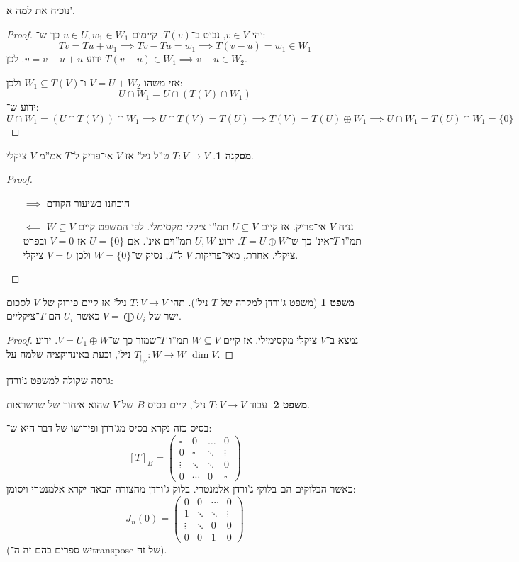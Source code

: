 \documentclass[a4paper]{article}
\newcommand\co        {\colon}
\newcommand\pms[1]    {\begin{pmatrix}
		#1
\end{pmatrix}}
\theoremstyle{definition}
\newtheorem{Theorem}{משפט}
\newtheorem{Collary}{מסקנה}
\newcommand\cola [1] {\begin{Collary}#1\end{Collary}}
\newcommand\theo  [1] {\begin{Theorem}#1\end{Theorem}}
\begin{document}
	נוכיח את למה א'. \begin{proof}
		יהי $v \in V$, נביט ב־$T(v)$. קיימים $u \in U, w_1 \in W_1$ כך ש־: 
		\[ Tv = Tu + w_1 \implies Tv - Tu = w_1 \implies T(v - u) = w_1 \in W_1 \]
		ידוע $v = v - u + u$. לכן $T(v - u) \in W_1 \implies v - u \in W_2$. 
		
		אזי משהו $V = U + W_2$ ו־$W_1 \subseteq T(V)$ ולכן: 
		\[ U \cap W_1 = U \cap (T(V) \cap W_1) \]
		ידוע ש־: 
		\[ U \cap W_1 = (U \cap T(V)) \cap W_1 \implies U \cap T(V) = T(U) \implies T(V) = T(U) \oplus W_1 \implies U \cap W_1 = T(U) \cap W_1 = \{0\} \]
	\end{proof}
	
	\cola{$T \co V \to V$ ט''ל ניל' אז $V$ אי־פריק ל־$T$ אמ''מ $V$ ציקלי. }
	\begin{proof}\,
		\begin{itemize}
			\item[$\implies$]הוכחנו בשיעור הקודם
			\item[$\impliedby$]נניח $V$ אי־פריק. אז קיים $U \subseteq V$ תמ''ו ציקלי מקסימלי. לפי המשפט קיים $W \subseteq V$ תמ''ו $T$־אינ' כך ש־$T = U \oplus W$. ידוע $U, W$ תמ''וים אינ'. אם $U = \{0\}$ אז $V = 0$ ובפרט ציקלי. אחרת, מאי־פריקות $V$ ל־$T$, נסיק ש־$W = \{0\}$ ולכן $V = U$ ציקלי. 
		\end{itemize}
	\end{proof}
	
	\begin{Theorem}[משפט ג'ורדן למקרה של $T$ ניל']
		תהי $T \co V \to V$ ניל' אז קיים פירוק של $V$ לסכום ישר של $V = \bigoplus U_i$ כאשר $U_i$ הם $T$־ציקליים. 
	\end{Theorem}
	\begin{proof}
		נמצא ב־$V$ ציקלי מקסימילי. אז קיים $W \subseteq V$ תמ''ו $T$־שמור כך ש־$V = U_1 \oplus W$. ידוע $T_{|_W} \co W \to W$ ניל', וכעת באינדוקציה שלמה על $\dim V$. 
	\end{proof}
	
	גרסה שקולה למשפט ג'ורדן: \theo{עבוד $T \co V \to V$ ניל', קיים בסיס $B$ של $V$ שהוא איחור של שרשראות. }
	
	בסיס כזה נקרא בסיס מג'רדן ופירושו של דבר היא ש־: 
	\[ [T]_B = \pms{\square & 0 & \dots &0 \\ 0 & \square & \ddots & \vdots \\ \vdots & \ddots & \ddots & 0 \\ 0 & \cdots & 0 & \square} \]
	כאשר הבלוקים הם בלוקי ג'ורדן אלמנטרי. בלוק ג'ורדן מהצורה הבאה יקרא אלמנטרי ויסומן: 
	\[ J_n(0) = \pms{0 & 0 & \cdots & 0 \\ 1 & \ddots & \ddots & \vdots \\ \vdots & \ddots & 0 & 0 \\ 0 & 0 & 1 & 0} \]
	(יש ספרים בהם זה ה־transpose של זה). 
	
\end{document}
